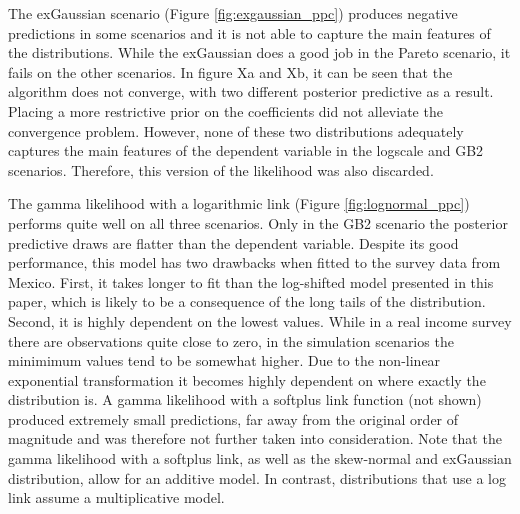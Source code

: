 The exGaussian scenario (Figure \ref{fig:exgaussian_ppc}) produces negative predictions in some scenarios and it is not able to capture the main features of the distributions.
While the exGaussian does a good job in the Pareto scenario, it fails on the other scenarios.
In figure Xa and Xb, it can be seen that the algorithm does not converge, with two different posterior predictive as a result.
Placing a more restrictive prior on the coefficients did not alleviate the convergence problem.
However, none of these two distributions adequately captures the main features of the dependent variable in the logscale and GB2 scenarios.
Therefore, this version of the likelihood was also discarded.


The gamma likelihood with a logarithmic link (Figure \ref{fig:lognormal_ppc}) performs quite well on all three scenarios.
Only in the GB2 scenario the posterior predictive draws are flatter than the dependent variable.
Despite its good performance, this model has two drawbacks when fitted to the survey data from Mexico.
First, it takes longer to fit than the log-shifted model presented in this paper, which is likely to be a consequence of the long tails of the distribution.
Second, it is highly dependent on the lowest values.
While in a real income survey there are observations quite close to zero, in the simulation scenarios the minimimum values tend to be somewhat higher.
Due to the non-linear exponential transformation it becomes highly dependent on where exactly the distribution is.
A gamma likelihood with a softplus link function (not shown) produced extremely small predictions, far away from the original order of magnitude and was therefore not further taken into consideration.
Note that the gamma likelihood with a softplus link, as well as the skew-normal and exGaussian distribution, allow for an additive model.
In contrast, distributions that use a log link assume a multiplicative model.

